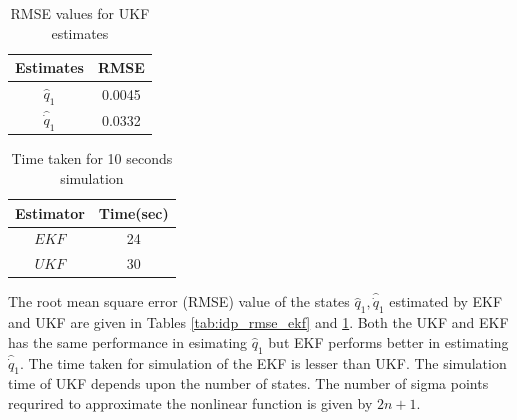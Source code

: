 \begin{table}[H]
    \centering
    \begin{tabular}{|c|c|}
    \hline
    Estimates &RMSE \\ \hline
    $\hat q_1$   &0.0045 \\ \hline
    $\hat {\dot q}_1$ & 0.0332 \\ \hline
    \end{tabular}
    \caption{RMSE values for UKF estimates}
    \label{tab:idp_rmse_ukf}
\end{table}

\begin{table}[H]
    \centering
    \begin{tabular}{|c|c|}
    \hline
    Estimator &Time(sec) \\ \hline
    $EKF$ &24 \\ \hline
    $UKF$ &30 \\ \hline
    \end{tabular}
    \caption{Time taken for 10 seconds simulation}
    \label{tab:idp_sim_time}
\end{table}
The root mean square error (RMSE) value of the states $\hat q_1, \hat{\dot q}_1 $ estimated by EKF and UKF are given in Tables \ref{tab:idp_rmse_ekf} and \ref{tab:idp_rmse_ukf}. Both the UKF and EKF has the same performance in esimating $\hat q_1$ but EKF performs better in estimating $\hat{\dot q}_1$. The time taken for simulation of the EKF is lesser than UKF. The simulation time of UKF depends upon the number of states. The number of sigma points requrired to approximate the nonlinear function is given by $2n+1$.
